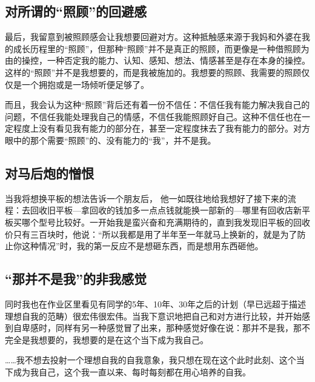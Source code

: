 \subsection*{对所谓的“照顾”的回避感}

最后，我留意到被照顾感会让我想要回避对方。这种抵触感来源于我妈和外婆在我的成长历程里的“照顾”，但那种“照顾”并不是真正的照顾，而更像是一种借照顾为由的操控，一种否定我的能力、认知、感知、想法、情感甚至是存在本身的操控。这样的“照顾”并不是我想要的，而是我被施加的。我想要的照顾、我需要的照顾仅仅是一个拥抱或是一场倾听便足够了。

而且，我会认为这种“照顾”背后还有着一份不信任：不信任我有能力解决我自己的问题，不信任我能处理我自己的情感，不信任我能照顾好自己。这种不信任也在一定程度上没有看见我有能力的部分在，甚至一定程度抹去了我有能力的部分。对方眼中的那个需要“照顾”的、没有能力的“我”，并不是我。







\subsection*{对马后炮的憎恨}

当我将想换平板的想法告诉一个朋友后， 他一如既往地给我想好了接下来的流程：去回收旧平板—拿回收的钱加多一点点钱就能换一部新的—哪里有回收店\pozhehao{}新平板买哪个型号比较好。一开始我是蛮兴奋和充满期待的，直到我发现旧平板的回收价只有三百块时，他说：“所以我都是用了半年至一年就马上换新的，就是为了防止你这种情况”时，我的第一反应不是想砸东西，而是想用东西砸他。







\subsection*{“那并不是我”的非我感觉}

同时我也在作业区里看见有同学的5年、10年、30年之后的计划（早已远超于描述理想自我的范畴）很宏伟很宏伟。当我下意识地把自己和对方进行比较，并开始感到自卑感时，同样有另一种感觉冒了出来，那种感觉好像在说：那并不是我，那不完全是我想要的，我想要的是在这个当下成为我自己。

……我不想去投射一个理想自我的自我意象，我只想在现在这个此时此刻、这个当下成为我自己，这个我一直以来、每时每刻都在用心培养的自我。

